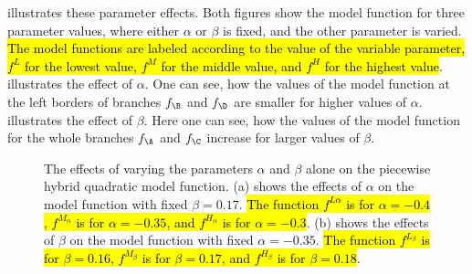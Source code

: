  illustrates these parameter effects.
Both figures show the model function for three parameter values, where either $\alpha$ or $\beta$ is fixed, and the other parameter is varied.
\hl{The model functions are labeled according to the value of the variable parameter, $f^L$ for the lowest value, $f^M$ for the middle value, and $f^H$ for the highest value}.
 illustrates the effect of $\alpha$.
One can see, how the values of the model function at the left borders of branches $f_\B$ and $f_\D$ are smaller for higher values of $\alpha$.
 illustrates the effect of $\beta$.
Here one can see, how the values of the model function for the whole branches $f_\A$ and $f_\C$ increase for larger values of $\beta$.

\begin{figure}
	\centering
	\caption[The effects of single parameters on the piecewise hybrid quadratic model function]{
		The effects of varying the parameters $\alpha$ and $\beta$ alone on the piecewise hybrid quadratic model function.
		(a) shows the effects of $\alpha$ on the model function with fixed $\beta = 0.17$.
		\hl{The function $f^{L\alpha}$ is for $\alpha = -0.4$, $f^{M_\alpha}$ is for $\alpha = -0.35$, and $f^{H_\alpha}$ is for $\alpha = -0.3$}.
		(b) shows the effects of $\beta$ on the model function with fixed $\alpha = -0.35$.
		\hl{The function $f^{L_\beta}$ is for $\beta = 0.16$, $f^{M_\beta}$ is for $\beta = 0.17$, and $f^{H_\beta}$ is for $\beta = 0.18$}.
	}
	\label{fig:setup.arch.paramfx}
\end{figure}

